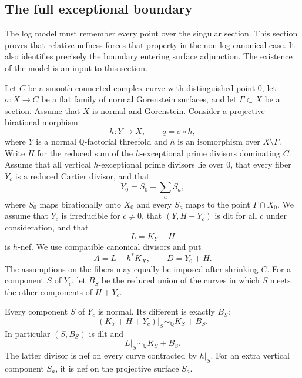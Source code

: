 \subsection{The full exceptional boundary}
\label{sec:full-boundary}

The log model must remember every point over the singular section.  This
section proves that relative nefness forces that property in the
non-log-canonical case.  It also identifies precisely the boundary entering
surface adjunction.  The existence of the model is an input to this section.

Let $C$ be a smooth connected complex curve with distinguished point $0$,
let $\sigma:X\to C$ be a flat family of normal Gorenstein surfaces, and let
$\Gamma\subset X$ be a section.  Assume that $X$ is normal and Gorenstein.
Consider a projective birational morphism
\[
 h:Y\longrightarrow X,\qquad q=\sigma\circ h,
\]
where $Y$ is a normal $\mathbb Q$-factorial threefold and $h$ is an
isomorphism over $X\setminus\Gamma$.  Write $H$ for the reduced sum of the
$h$-exceptional prime divisors dominating $C$.  Assume that all vertical
$h$-exceptional prime divisors lie over $0$, that every fiber $Y_c$ is a
reduced Cartier divisor, and that
\[
 Y_0=S_0+\sum_a S_a,
\]
where $S_0$ maps birationally onto $X_0$ and every $S_a$ maps to the point
$\Gamma\cap X_0$.  We assume that $Y_c$ is irreducible for $c\ne0$, that
$(Y,H+Y_c)$ is dlt for all $c$ under consideration, and that
\[
 L=K_Y+H
\]
is $h$-nef.  We use compatible canonical divisors and put
\[
 A=L-h^*K_X,\qquad D=Y_0+H.
\]
The assumptions on the fibers may equally be imposed after shrinking $C$.
For a component $S$ of $Y_c$, let $B_S$ be the reduced union of the curves
in which $S$ meets the other components of $H+Y_c$.

\begin{lemma}
\label{lem:surface-boundary}
Every component $S$ of $Y_c$ is normal.  Its different is exactly $B_S$:
\[
 (K_Y+H+Y_c)|_S\sim_{\mathbb Q}K_S+B_S.
\]
In particular $(S,B_S)$ is dlt and
\[
 L|_S\sim_{\mathbb Q}K_S+B_S.
\]
The latter divisor is nef on every curve contracted by $h|_S$.  For an
extra vertical component $S_a$, it is nef on the projective surface $S_a$.
\end{lemma}

